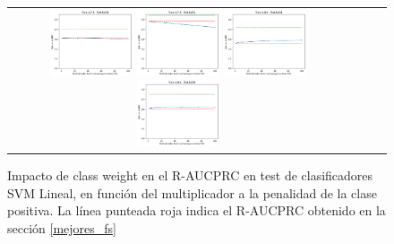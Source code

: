 \begin{figure}[h!]
\begin{tabular}{cccc}
\includegraphics[width=0.25\textwidth]{Kap7/cw/train=b278_test=b234_linear_individual_curves.png}  \includegraphics[width=0.25\textwidth]{Kap7/cw/train=b278_test=b261_linear_individual_curves.png} 
 \includegraphics[width=0.25\textwidth]{Kap7/cw/train=b360_test=b234_linear_individual_curves.png}  \includegraphics[width=0.25\textwidth]{Kap7/cw/train=b360_test=b278_linear_individual_curves.png} 
\end{tabular}
\caption{Impacto de class weight en el R-AUCPRC en test de clasificadores SVM Lineal, en función del multiplicador a la penalidad de la clase positiva. La línea punteada roja indica el R-AUCPRC obtenido en la sección \protect\ref{mejores_fs}}
\label{fig:cw_l}
\end{figure}

